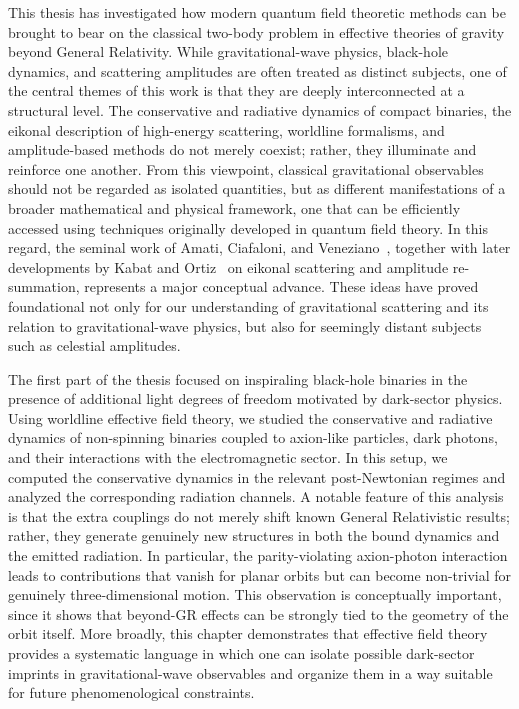 \documentclass[11pt,a4paper,oneside]{book}
\begin{document}
This thesis has investigated how modern quantum field theoretic methods can be brought to bear on the classical two-body problem in effective theories of gravity beyond General Relativity. While gravitational-wave physics, black-hole dynamics, and scattering amplitudes are often treated as distinct subjects, one of the central themes of this work is that they are deeply interconnected at a structural level. The conservative and radiative dynamics of compact binaries, the eikonal description of high-energy scattering, worldline formalisms, and amplitude-based methods do not merely coexist; rather, they illuminate and reinforce one another. From this viewpoint, classical gravitational observables should not be regarded as isolated quantities, but as different manifestations of a broader mathematical and physical framework, one that can be efficiently accessed using techniques originally developed in quantum field theory. In this regard, the seminal work of Amati, Ciafaloni, and Veneziano~\cite{Amati:1990xe}, together with later developments by Kabat and Ortiz~\cite{Kabat:1992tb} on eikonal scattering and amplitude re-summation, represents a major conceptual advance. These ideas have proved foundational not only for our understanding of gravitational scattering and its relation to gravitational-wave physics, but also for seemingly distant subjects such as celestial amplitudes.

The first part of the thesis focused on inspiraling black-hole binaries in the presence of additional light degrees of freedom motivated by dark-sector physics. Using worldline effective field theory, we studied the conservative and radiative dynamics of non-spinning binaries coupled to axion-like particles, dark photons, and their interactions with the electromagnetic sector. In this setup, we computed the conservative dynamics in the relevant post-Newtonian regimes and analyzed the corresponding radiation channels. A notable feature of this analysis is that the extra couplings do not merely shift known General Relativistic results; rather, they generate genuinely new structures in both the bound dynamics and the emitted radiation. In particular, the parity-violating axion-photon interaction leads to contributions that vanish for planar orbits but can become non-trivial for genuinely three-dimensional motion. This observation is conceptually important, since it shows that beyond-GR effects can be strongly tied to the geometry of the orbit itself. More broadly, this chapter demonstrates that effective field theory provides a systematic language in which one can isolate possible dark-sector imprints in gravitational-wave observables and organize them in a way suitable for future phenomenological constraints.
\end{document}

